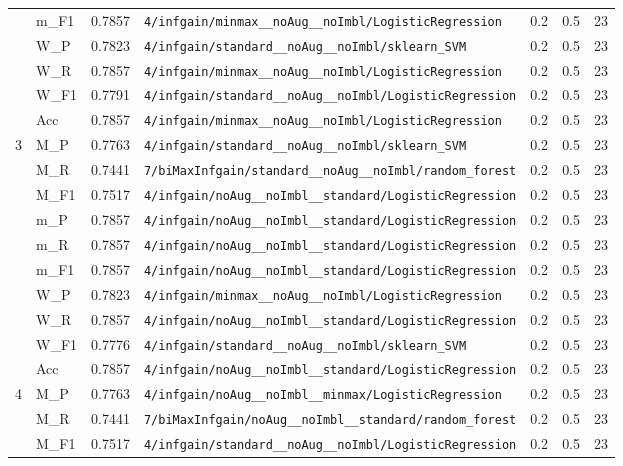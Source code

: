 \begin{table}[htbp]
\begin{tabular}{|c|l|c|>{\ttfamily\footnotesize}p{7.2cm}|c|c|c|}
 & m\_F1 & 0.7857 & \texttt{4/infgain/minmax\_\_noAug\_\_noImbl/LogisticRegression} & 0.2 & 0.5  & 23 \\ 
 & W\_P & 0.7823 & \texttt{4/infgain/standard\_\_noAug\_\_noImbl/sklearn\_SVM} & 0.2 & 0.5  & 23 \\ 
 & W\_R & 0.7857 & \texttt{4/infgain/minmax\_\_noAug\_\_noImbl/LogisticRegression} & 0.2 & 0.5  & 23 \\ 
 & W\_F1 & 0.7791 & \texttt{4/infgain/standard\_\_noAug\_\_noImbl/LogisticRegression} & 0.2 & 0.5  & 23 \\ 
 & Acc & 0.7857 & \texttt{4/infgain/minmax\_\_noAug\_\_noImbl/LogisticRegression} & 0.2 & 0.5  & 23 \\ 
\hline
\multirow{10}{*}{3} & M\_P & 0.7763 & \texttt{4/infgain/standard\_\_noAug\_\_noImbl/sklearn\_SVM} & 0.2 & 0.5  & 23 \\ 
 & M\_R & 0.7441 & \texttt{7/biMaxInfgain/standard\_\_noAug\_\_noImbl/random\_forest} & 0.2 & 0.5  & 23 \\ 
 & M\_F1 & 0.7517 & \texttt{4/infgain/noAug\_\_noImbl\_\_standard/LogisticRegression} & 0.2 & 0.5  & 23 \\ 
 & m\_P & 0.7857 & \texttt{4/infgain/noAug\_\_noImbl\_\_standard/LogisticRegression} & 0.2 & 0.5  & 23 \\ 
 & m\_R & 0.7857 & \texttt{4/infgain/noAug\_\_noImbl\_\_standard/LogisticRegression} & 0.2 & 0.5  & 23 \\ 
 & m\_F1 & 0.7857 & \texttt{4/infgain/noAug\_\_noImbl\_\_standard/LogisticRegression} & 0.2 & 0.5  & 23 \\ 
 & W\_P & 0.7823 & \texttt{4/infgain/minmax\_\_noAug\_\_noImbl/LogisticRegression} & 0.2 & 0.5  & 23 \\ 
 & W\_R & 0.7857 & \texttt{4/infgain/noAug\_\_noImbl\_\_standard/LogisticRegression} & 0.2 & 0.5  & 23 \\ 
 & W\_F1 & 0.7776 & \texttt{4/infgain/standard\_\_noAug\_\_noImbl/sklearn\_SVM} & 0.2 & 0.5  & 23 \\ 
 & Acc & 0.7857 & \texttt{4/infgain/noAug\_\_noImbl\_\_standard/LogisticRegression} & 0.2 & 0.5  & 23 \\ 
\hline
\multirow{10}{*}{4} & M\_P & 0.7763 & \texttt{4/infgain/noAug\_\_noImbl\_\_minmax/LogisticRegression} & 0.2 & 0.5  & 23 \\ 
 & M\_R & 0.7441 & \texttt{7/biMaxInfgain/noAug\_\_noImbl\_\_standard/random\_forest} & 0.2 & 0.5  & 23 \\ 
 & M\_F1 & 0.7517 & \texttt{4/infgain/standard\_\_noAug\_\_noImbl/LogisticRegression} & 0.2 & 0.5  & 23 \\ 

\end{tabular}
\end{table}
